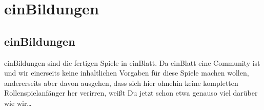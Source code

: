 \part {einBildungen}
\chapter {einBildungen}
einBildungen sind die fertigen Spiele in einBlatt. Da einBlatt eine Community ist und wir einerseits keine inhaltlichen Vorgaben für diese Spiele machen wollen, andererseits aber davon ausgehen, dass sich hier ohnehin keine kompletten Rollenspielanfänger her verirren, weißt Du jetzt schon etwa genauso viel darüber wie wir\dots
